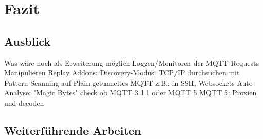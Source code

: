 \chapter{Fazit}

\section{Ausblick}
Was wäre noch als Erweiterung möglich
    Loggen/Monitoren der MQTT-Requests
    Manipulieren
    Replay
    Addons:
    Discovery-Modus: TCP/IP durchsuchen mit Pattern Scanning auf Plain getunneltes MQTT z.B.: in SSH, Websockets
    Auto-Analyse: "Magic Bytes" check ob MQTT 3.1.1 oder MQTT 5
    MQTT 5: Proxien und decoden

\section{Weiterführende Arbeiten}